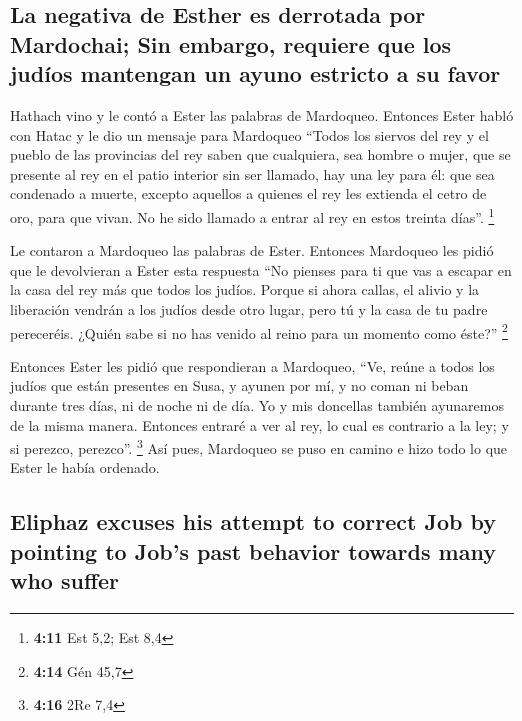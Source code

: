 \begin{paracol}{2}
\hypertarget{la-negativa-de-esther-es-derrotada-por-mardochai-sin-embargo-requiere-que-los-juduxedos-mantengan-un-ayuno-estricto-a-su-favor}{%
\subsection{La negativa de Esther es derrotada por Mardochai; Sin
embargo, requiere que los judíos mantengan un ayuno estricto a su
favor}\label{la-negativa-de-esther-es-derrotada-por-mardochai-sin-embargo-requiere-que-los-juduxedos-mantengan-un-ayuno-estricto-a-su-favor}}

 Hathach vino y le contó a Ester las palabras de
Mardoqueo.  Entonces Ester habló con Hatac y le dio un
mensaje para Mardoqueo  ``Todos los siervos del rey y el
pueblo de las provincias del rey saben que cualquiera, sea hombre o
mujer, que se presente al rey en el patio interior sin ser llamado, hay
una ley para él: que sea condenado a muerte, excepto aquellos a quienes
el rey les extienda el cetro de oro, para que vivan. No he sido llamado
a entrar al rey en estos treinta días''. \footnote{\textbf{4:11} Est
  5,2; Est 8,4}

 Le contaron a Mardoqueo las palabras de Ester.
 Entonces Mardoqueo les pidió que le devolvieran a Ester
esta respuesta ``No pienses para ti que vas a escapar en la casa del rey
más que todos los judíos.  Porque si ahora callas, el
alivio y la liberación vendrán a los judíos desde otro lugar, pero tú y
la casa de tu padre pereceréis. ¿Quién sabe si no has venido al reino
para un momento como éste?'' \footnote{\textbf{4:14} Gén 45,7}

 Entonces Ester les pidió que respondieran a Mardoqueo,
 ``Ve, reúne a todos los judíos que están presentes en
Susa, y ayunen por mí, y no coman ni beban durante tres días, ni de
noche ni de día. Yo y mis doncellas también ayunaremos de la misma
manera. Entonces entraré a ver al rey, lo cual es contrario a la ley; y
si perezco, perezco''. \footnote{\textbf{4:16} 2Re 7,4} 
Así pues, Mardoqueo se puso en camino e hizo todo lo que Ester le había
ordenado.

\switchcolumn
\begin{otherlanguage}{english}

\hypertarget{eliphaz-excuses-his-attempt-to-correct-job-by-pointing-to-jobs-past-behavior-towards-many-who-suffer}{%
\subsection{Eliphaz excuses his attempt to correct Job by pointing to
Job's past behavior towards many who
suffer}\label{eliphaz-excuses-his-attempt-to-correct-job-by-pointing-to-jobs-past-behavior-towards-many-who-suffer}}


\end{otherlanguage}
\end{paracol}
